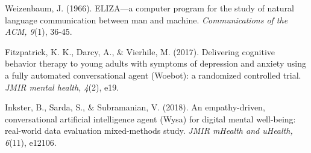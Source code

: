 \newpage
\begin{thebibliography}{99}

 Weizenbaum, J. (1966). ELIZA—a computer program for the study of natural language communication between man and machine. \textit{Communications of the ACM, 9}(1), 36-45.

 Fitzpatrick, K. K., Darcy, A., \& Vierhile, M. (2017). Delivering cognitive behavior therapy to young adults with symptoms of depression and anxiety using a fully automated conversational agent (Woebot): a randomized controlled trial. \textit{JMIR mental health, 4}(2), e19.

 Inkster, B., Sarda, S., \& Subramanian, V. (2018). An empathy-driven, conversational artificial intelligence agent (Wysa) for digital mental well-being: real-world data evaluation mixed-methods study. \textit{JMIR mHealth and uHealth, 6}(11), e12106.









\end{thebibliography}
